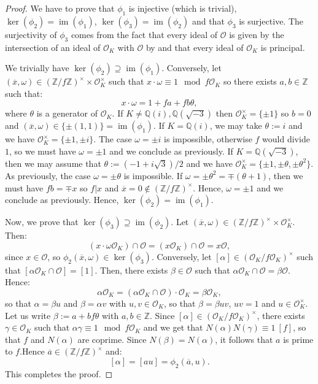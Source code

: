\documentclass[a4paper,10pt,notitlepage]{report}
\theoremstyle{definition}
\theoremstyle{plain}
\theoremstyle{definition}
\newcommand{\Z}{\mathbb{Z}}
\newcommand{\Q}{\mathbb{Q}}
\newcommand{\mO}{\mathcal{O}}
\DeclareMathOperator{\im}{im}
\renewcommand{\(}{\left(}
\renewcommand{\)}{\right)}
\begin{document}
\begin{proof}
We have to prove that $\phi_1$ is injective (which is trivial), $\ker(\phi_2)=\im(\phi_1)$, $\ker(\phi_3)=\im(\phi_2)$ and that $\phi_3$ is surjective. The surjectivity of $\phi_3$ comes from the fact that every ideal of $\mO$ is given by the intersection of an ideal of $\mO_K$ with $\mO$ by \cite[Proposition 7.20]{Cox} and that every ideal of $\mO_K$ is principal.

We trivially have $\ker(\phi_2)\supseteq \im(\phi_1)$. Conversely, let $(\overline{x},\omega)\in (\Z/f\Z)^\times\times \mO_K^\times$ such that $x\cdot \omega\equiv 1 \mod f\mO_K$ so there exists $a, b\in\Z$ such that:
\[x\cdot\omega=1+fa+fb\theta,\]
where $\theta$ is a generator of $\mO_K$. If $K\neq\Q(i),\Q(\sqrt{-3})$ then $\mO_K^\times=\{\pm 1\}$ so $b=0$ and $(\overline{x},\omega)\in\{\pm(1,1)\}=\im(\phi_1)$. If $K=\Q(i)$, we may take $\theta:=i$ and we have $\mO_K^\times=\{\pm 1, \pm i\}$. The case $\omega=\pm i$ is impossible, otherwise $f$ would divide $1$, so we must have $\omega=\pm 1$ and we conclude as previously. If $K=\Q(\sqrt{-3})$, then we may assume that $\theta:=(-1+i\sqrt{3})/2$ and we have $\mO_K^\times=\{\pm 1, \pm \theta,\pm\theta^2\}$. As previously, the case $\omega=\pm \theta$ is impossible. If $\omega=\pm\theta^2=\mp(\theta+1)$, then we must have $fb=\mp x$ so $f|x$ and $\overline{x}=0\not\in(\Z/f\Z)^\times$. Hence, $\omega=\pm 1$ and we conclude as previously. Hence, $\ker(\phi_2)=\im(\phi_1)$.

Now, we prove that $\ker(\phi_3)\supseteq \im(\phi_2)$. Let $(\overline{x},\omega)\in (\Z/f\Z)^\times\times \mO_K^\times$. Then:
\[(x\cdot\omega\mO_K)\cap\mO=(x\mO_K)\cap\mO=x\mO,\]
since $x\in\mO$, so $\phi_2(\overline{x},\omega)\in \ker(\phi_3)$. Conversely, let $[\alpha]\in(\mO_K/f\mO_K)^\times$ such that $[\alpha\mO_K\cap\mO]=[1]$. Then, there exists $\beta\in\mO$ such that $\alpha\mO_K\cap\mO=\beta\mO$. Hence:
\[\alpha\mO_K=(\alpha\mO_K\cap\mO)\cdot\mO_K=\beta\mO_K,\]
so that $\alpha=\beta u$ and $\beta=\alpha v$ with $u, v\in\mO_K$, so that $\beta=\beta uv$, $uv=1$ and $u\in\mO_K^\times$. Let us write $\beta:=a+bf\theta$ with $a, b\in\Z$. Since $[\alpha]\in(\mO_K/f\mO_K)^\times$, there exists $\gamma\in\mO_K$ such that $\alpha\gamma\equiv 1 \mod f\mO_K$ and we get that $N(\alpha)N(\gamma)\equiv 1 \ [f]$, so that $f$ and $N(\alpha)$ are coprime.  Since $N(\beta)=N(\alpha)$, it follows that $a$ is prime to $f$.Hence $\overline{a}\in(\Z/f\Z)^\times$ and:
\[[\alpha]=[au]=\phi_2(\overline{a},u).\]
This completes the proof.
\end{proof}
\end{document}
